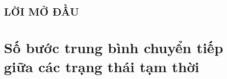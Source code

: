 \documentclass[14pt, a4paper]{article}
\numberwithin{equation}{section}
\numberwithin{figure}{section}
\theoremstyle{sltheorem}
\theoremstyle{soltheorem}
\numberwithin{dl}{section}
\numberwithin{vd}{section}
\begin{document}
\begin{titlepage}





        \vfill %

    \end{titlepage}

    \cleardoublepage
    \tableofcontents
    \newpage
    \listoffigures
    \newpage
    \glsaddall 
    \renewcommand*{\glossaryname}{Danh mục các từ viết tắt}
    \renewcommand*{\acronymname}{Danh sách từ viết tắt}
    \renewcommand*{\entryname}{Viết tắt}
    \renewcommand*{\descriptionname}{Viết đầy đủ}
    \printnoidxglossary
    \cleardoublepage


    \newpage

    \nocite{*}

    \begin{center}
    \section*{LỜI MỞ ĐẦU}
    \end{center}

    \newpage

    \section{Số bước trung bình chuyển tiếp giữa các trạng thái tạm thời}
\end{document}
